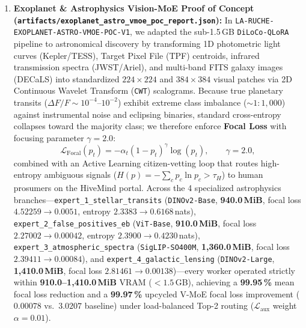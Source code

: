 \documentclass[11pt,a4paper]{article}
\begin{document}
\begin{enumerate}[leftmargin=1.8em]
    \item \textbf{Exoplanet \& Astrophysics Vision-MoE Proof of Concept (\texttt{artifacts/\allowbreak exoplanet\_\allowbreak astro\_\allowbreak vmoe\_\allowbreak poc\_\allowbreak report.json}):}
    In \texttt{LA-RUCHE-EXOPLANET-ASTRO-VMOE-POC-V1}, we adapted the sub-1.5\,GB \texttt{DiLoCo-QLoRA} pipeline to astronomical discovery by transforming 1D photometric light curves (Kepler/TESS), Target Pixel File (TPF) centroids, infrared transmission spectra (JWST/Ariel), and multi-band FITS galaxy images (DECaLS) into standardized $224 \times 224$ and $384 \times 384$ visual patches via 2D Continuous Wavelet Transform (\texttt{CWT}) scalograms. Because true planetary transits ($\Delta F / F \sim 10^{-4}\text{--}10^{-2}$) exhibit extreme class imbalance ($\sim 1:1{,}000$) against instrumental noise and eclipsing binaries, standard cross-entropy collapses toward the majority class; we therefore enforce \textbf{Focal Loss} \cite{lin2017focal} with focusing parameter $\gamma = 2.0$:
    \begin{equation}
        \mathcal{L}_{\text{Focal}}(p_t) = -\alpha_t (1 - p_t)^{\gamma} \log(p_t), \qquad \gamma = 2.0,
    \end{equation}
    combined with an Active Learning citizen-vetting loop that routes high-entropy ambiguous signals ($H(p) = -\sum_c p_c \ln p_c > \tau_H$) to human prosumers on the HiveMind portal. Across the 4 specialized astrophysics branches---\texttt{expert\_1\_stellar\_transits} (\texttt{DINOv2-Base}, \textbf{940.0\,MiB}, focal loss $4.52259 \to 0.0051$, entropy $2.3383 \to 0.6168$\,nats), \texttt{expert\_2\_false\_positives\_eb} (\texttt{ViT-Base}, \textbf{910.0\,MiB}, focal loss $2.27002 \to 0.00042$, entropy $2.3900 \to 0.4230$\,nats), \texttt{expert\_3\_atmospheric\_spectra} (\texttt{SigLIP-SO400M}, \textbf{1{,}360.0\,MiB}, focal loss $2.39411 \to 0.00084$), and \texttt{expert\_4\_galactic\_lensing} (\texttt{DINOv2-Large}, \textbf{1{,}410.0\,MiB}, focal loss $2.81461 \to 0.00138$)---every worker operated strictly within \textbf{910.0--1{,}410.0\,MiB} VRAM ($< 1.5$\,GB), achieving a \textbf{99.95\,\%} mean focal loss reduction and a \textbf{99.97\,\%} upcycled V-MoE focal loss improvement ($0.00078$ vs.\ $3.0207$ baseline) under load-balanced Top-2 routing ($\mathcal{L}_{\text{aux}}$ weight $\alpha = 0.01$).


\end{enumerate}
\end{document}
